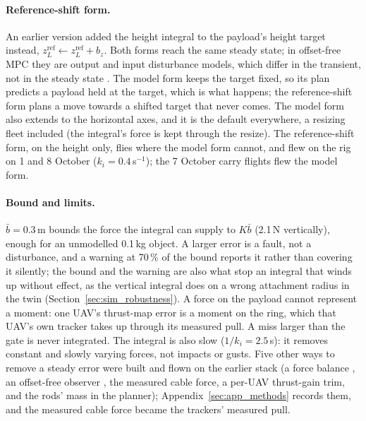 \paragraph{Reference-shift form.} An earlier version added the height integral to the payload's height
target instead, $z_L^{\mathrm{ref}} \leftarrow z_L^{\mathrm{ref}} + b_z$. Both forms reach the same steady
state; in offset-free MPC they are output and input disturbance models, which differ in the transient, not
in the steady state \cite{pannocchia2007combined}. The model form keeps the target fixed, so its plan
predicts a payload held at the target, which is what happens; the reference-shift form plans a move towards
a shifted target that never comes. The model form also extends to the horizontal axes, and it is the
default everywhere, a resizing fleet included (the integral's force is kept through the resize). The
reference-shift form, on the height only, flies where the model form cannot, and flew on the rig on 1 and
8 October ($k_i = 0.4$\,s$^{-1}$); the 7 October carry flights flew the model form.

\paragraph{Bound and limits.} $\bar{b} = 0.3$\,m bounds the force the integral can supply to $K\bar{b}$
(2.1\,N vertically), enough for an unmodelled 0.1\,kg object. A larger error is a fault, not a disturbance,
and a warning at 70\,\% of the bound reports it rather than covering it silently; the bound and the warning are
also what stop an integral that winds up without effect, as the vertical integral does on a wrong attachment
radius in the twin (Section~\ref{sec:sim_robustness}). A force on the payload cannot represent a moment: one UAV's
thrust-map error is a moment on the ring, which that UAV's own tracker takes up through its measured pull. A miss
larger than the gate is never integrated. The integral is also slow ($1/k_i = 2.5$\,s): it removes constant and
slowly varying forces, not impacts or gusts. Five other ways to remove a steady error were built and flown on the
earlier stack (a force balance \cite{muske2002disturbance}, an offset-free observer
\cite{pannocchia2003disturbance}, the measured cable force, a per-UAV thrust-gain trim, and the rods' mass in the
planner); Appendix~\ref{sec:app_methods} records them, and the measured cable force became the trackers' measured
pull.

